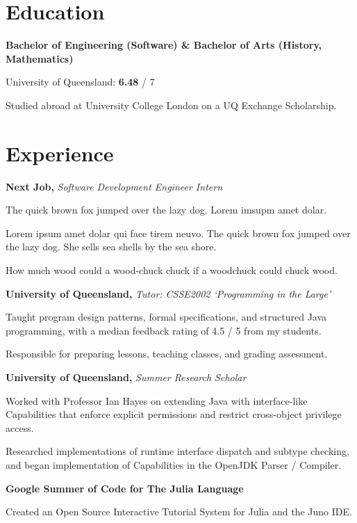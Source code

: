 \documentclass[a4paper]{article}
\renewenvironment{itemize}{
  \begin{list}{}{
    \setlength{\leftmargin}{1.5em}
  }
}{
  \end{list}
}
\newcommand{\dateitem}[1] {\item[\textbf{#1 :}]}
\newcommand{\accentcolour}{\color{NavyBlue}}
\newcommand{\resumesection}[1]{\section*{\accentcolour #1}}
\newcommand{\resumeitem}[4]{
	\dateitem{#1} {\textbf{#2,} \textit{#3}
		
		#4
	}	
}
\begin{document}
\begin{paracol}{2}

\resumesection{Education}
\titlespacing*{\section}{-30pt}{2.2ex}{1ex}
\begin{itemize}
	\dateitem{2014 -- 2019} {\textbf{Bachelor of Engineering (Software) \&
			Bachelor of Arts (History, Mathematics)}
		
		University of Queensland: \textbf{6.48} / 7
		
		\dateitem{2017} Studied abroad at University College London on a UQ Exchange Scholarship.
	}
\end{itemize}

\resumesection{Experience}
\begin{itemize}	
	\resumeitem{2018 -- 2019}{Next Job}{Software Development Engineer Intern}{
		The quick brown fox jumped over the lazy dog. Lorem imsupm amet dolar.
		
		Lorem ipsum amet dolar qui face tirem neuvo. The quick brown fox jumped over the lazy dog. She sells sea shells by the sea shore.
		
		How much wood could a wood-chuck chuck if a woodchuck could chuck wood. 
	}
	
	\resumeitem{2017}{University of Queensland}{Tutor: CSSE2002 `Programming in the Large'}{		
		Taught program design patterns, formal specifications, and structured Java programming, with a median feedback rating of 4.5 / 5 from my students.
		
		Responsible for preparing lessons, teaching classes, and grading assessment.
	}

	\resumeitem{2016 -- 2017}{University of Queensland}{Summer Research Scholar}{		
		Worked with Professor Ian Hayes on extending Java with interface-like Capabilities that enforce explicit permissions and restrict cross-object privilege access.
		
		Researched implementations of runtime interface dispatch and subtype checking, and began implementation of Capabilities in the OpenJDK Parser / Compiler.
		
	}

	\dateitem{2016}{\textbf{Google Summer of Code for The Julia Language}
		
		Created an Open Source Interactive Tutorial System for Julia and the Juno IDE.
		
}
\end{itemize}
\end{paracol}
\end{document}
